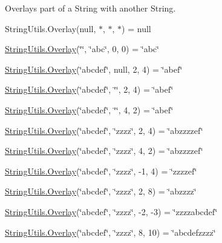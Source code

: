 Overlays part of a String with another String. 

String\+Utils.\+Overlay(null, $\ast$, $\ast$, $\ast$) = null 

\hyperlink{class_ultimate_1_1_utilities_1_1_string_utils_a7adbec612599b055c98ee56904abe7bb}{String\+Utils.\+Overlay}(\char`\"{}\char`\"{}, \char`\"{}abc\char`\"{}, 0, 0) = \char`\"{}abc\char`\"{} 

\hyperlink{class_ultimate_1_1_utilities_1_1_string_utils_a7adbec612599b055c98ee56904abe7bb}{String\+Utils.\+Overlay}(\char`\"{}abcdef\char`\"{}, null, 2, 4) = \char`\"{}abef\char`\"{} 

\hyperlink{class_ultimate_1_1_utilities_1_1_string_utils_a7adbec612599b055c98ee56904abe7bb}{String\+Utils.\+Overlay}(\char`\"{}abcdef\char`\"{}, \char`\"{}\char`\"{}, 2, 4) = \char`\"{}abef\char`\"{} 

\hyperlink{class_ultimate_1_1_utilities_1_1_string_utils_a7adbec612599b055c98ee56904abe7bb}{String\+Utils.\+Overlay}(\char`\"{}abcdef\char`\"{}, \char`\"{}\char`\"{}, 4, 2) = \char`\"{}abef\char`\"{} 

\hyperlink{class_ultimate_1_1_utilities_1_1_string_utils_a7adbec612599b055c98ee56904abe7bb}{String\+Utils.\+Overlay}(\char`\"{}abcdef\char`\"{}, \char`\"{}zzzz\char`\"{}, 2, 4) = \char`\"{}abzzzzef\char`\"{} 

\hyperlink{class_ultimate_1_1_utilities_1_1_string_utils_a7adbec612599b055c98ee56904abe7bb}{String\+Utils.\+Overlay}(\char`\"{}abcdef\char`\"{}, \char`\"{}zzzz\char`\"{}, 4, 2) = \char`\"{}abzzzzef\char`\"{} 

\hyperlink{class_ultimate_1_1_utilities_1_1_string_utils_a7adbec612599b055c98ee56904abe7bb}{String\+Utils.\+Overlay}(\char`\"{}abcdef\char`\"{}, \char`\"{}zzzz\char`\"{}, -\/1, 4) = \char`\"{}zzzzef\char`\"{} 

\hyperlink{class_ultimate_1_1_utilities_1_1_string_utils_a7adbec612599b055c98ee56904abe7bb}{String\+Utils.\+Overlay}(\char`\"{}abcdef\char`\"{}, \char`\"{}zzzz\char`\"{}, 2, 8) = \char`\"{}abzzzz\char`\"{} 

\hyperlink{class_ultimate_1_1_utilities_1_1_string_utils_a7adbec612599b055c98ee56904abe7bb}{String\+Utils.\+Overlay}(\char`\"{}abcdef\char`\"{}, \char`\"{}zzzz\char`\"{}, -\/2, -\/3) = \char`\"{}zzzzabcdef\char`\"{} 

\hyperlink{class_ultimate_1_1_utilities_1_1_string_utils_a7adbec612599b055c98ee56904abe7bb}{String\+Utils.\+Overlay}(\char`\"{}abcdef\char`\"{}, \char`\"{}zzzz\char`\"{}, 8, 10) = \char`\"{}abcdefzzzz\char`\"{} 


